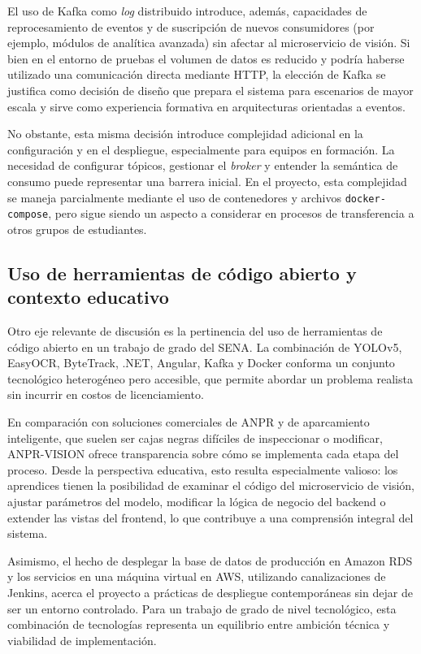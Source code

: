 El uso de Kafka como \textit{log} distribuido introduce, además, capacidades de reprocesamiento de eventos y de suscripción de nuevos consumidores (por ejemplo, módulos de analítica avanzada) sin afectar al microservicio de visión. Si bien en el entorno de pruebas el volumen de datos es reducido y podría haberse utilizado una comunicación directa mediante HTTP, la elección de Kafka se justifica como decisión de diseño que prepara el sistema para escenarios de mayor escala y sirve como experiencia formativa en arquitecturas orientadas a eventos.

No obstante, esta misma decisión introduce complejidad adicional en la configuración y en el despliegue, especialmente para equipos en formación. La necesidad de configurar tópicos, gestionar el \textit{broker} y entender la semántica de consumo puede representar una barrera inicial. En el proyecto, esta complejidad se maneja parcialmente mediante el uso de contenedores y archivos \texttt{docker-compose}, pero sigue siendo un aspecto a considerar en procesos de transferencia a otros grupos de estudiantes.

\subsection{Uso de herramientas de código abierto y contexto educativo}

Otro eje relevante de discusión es la pertinencia del uso de herramientas de código abierto en un trabajo de grado del SENA. La combinación de YOLOv5, EasyOCR, ByteTrack, .NET, Angular, Kafka y Docker conforma un conjunto tecnológico heterogéneo pero accesible, que permite abordar un problema realista sin incurrir en costos de licenciamiento.

En comparación con soluciones comerciales de ANPR y de aparcamiento inteligente, que suelen ser cajas negras difíciles de inspeccionar o modificar, ANPR-VISION ofrece transparencia sobre cómo se implementa cada etapa del proceso. Desde la perspectiva educativa, esto resulta especialmente valioso: los aprendices tienen la posibilidad de examinar el código del microservicio de visión, ajustar parámetros del modelo, modificar la lógica de negocio del backend o extender las vistas del frontend, lo que contribuye a una comprensión integral del sistema.

Asimismo, el hecho de desplegar la base de datos de producción en Amazon RDS y los servicios en una máquina virtual en AWS, utilizando canalizaciones de Jenkins, acerca el proyecto a prácticas de despliegue contemporáneas sin dejar de ser un entorno controlado. Para un trabajo de grado de nivel tecnológico, esta combinación de tecnologías representa un equilibrio entre ambición técnica y viabilidad de implementación.

